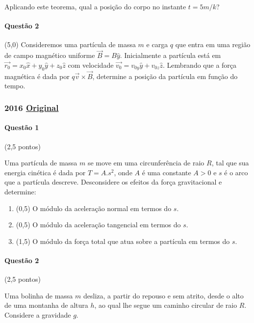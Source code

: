 \documentclass[12pt,a4paper]{article}
\newcommand{\original}[1]{\tiny \href{#1}{Original} \normalsize}
\begin{document}
Aplicando este teorema, qual a posição do corpo no instante $t = 5m/k$?

\paragraph{Questão 2}(5,0) Consideremos uma partícula de massa $m$ e carga $q$ que entra em uma região de campo magnético uniforme $\vec{B} = B\hat{y}$. Inicialmente a partícula está em $\vec{r_{0}} = x_{0}\hat{x} + y_{0}\hat{y} + z_{0}\hat{z}$ com velocidade $\vec{v_{0}} = v_{0y}\hat{y} + v_{0z}\hat{z}$. Lembrando que a força magnética é dada por $q\vec{v} \times \vec{B}$, determine a posição da partícula em função do tempo.

\newpage

\subsubsection{2016 \original{https://drive.google.com/file/d/1J3Hzk_KPTWWYHTxj_ku4ffNkQAMRZs2Z/view?usp=sharing}}

\paragraph{Questão 1} (2,5 pontos)

Uma partícula de massa $m$ se move em uma circunferência de raio $R$, tal que sua energia cinética é dada por $T=A.s^2$, onde $A$ é uma constante $A>0$ e $s$ é o arco que a partícula descreve. Desconsidere os efeitos da força gravitacional e determine:

\begin{enumerate}[label=(\alph*)]

\item (0,5) O módulo da aceleração normal em termos do $s$.

\item (0,5) O módulo da aceleração tangencial em termos do $s$.

\item (1,5) O módulo da força total que atua sobre a partícula em termos do $s$.

\end{enumerate}

\paragraph{Questão 2} (2,5 pontos)

Uma bolinha de massa $m$ desliza, a partir do repouso e sem atrito, desde o alto de uma montanha de altura $h$, ao qual lhe segue um caminho circular de raio $R$. Considere a gravidade $g$.
\end{document}
